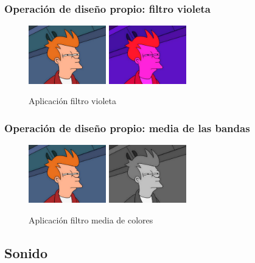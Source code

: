 \subsubsection{Operación de diseño propio: filtro violeta}
\vskip0.3cm
\begin{figure}[H]
 \centering
  \includegraphics[width=0.3\textwidth]{imagenes/Fry.jpg}
  \includegraphics[width=0.3\textwidth]{imagenes/fryVioleta.jpg}
 \caption{Aplicación filtro violeta}
 \label{diseño}
 \end{figure}
\subsubsection{Operación de diseño propio: media de las bandas}
\vskip0.3cm
\begin{figure}[H]
 \centering
  \includegraphics[width=0.3\textwidth]{imagenes/Fry.jpg}
  \includegraphics[width=0.3\textwidth]{imagenes/fryMediaBandas.jpg}
 \caption{Aplicación filtro media de colores}
 \label{diseño}
 \end{figure}
\subsection{Sonido}
